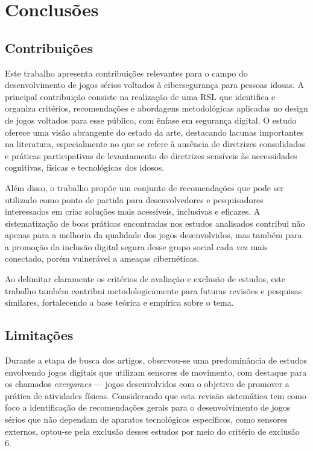 \chapter{Conclusões}
\label{cap:conclusoes}

\section{Contribuições}

Este trabalho apresenta contribuições relevantes para o campo do desenvolvimento de jogos sérios voltados à cibersegurança para pessoas idosas. A principal contribuição consiste na realização de uma RSL que identifica e organiza critérios, recomendações e abordagens metodológicas aplicadas no design de jogos voltados para esse público, com ênfase em segurança digital. O estudo oferece uma visão abrangente do estado da arte, destacando lacunas importantes na literatura, especialmente no que se refere à ausência de diretrizes consolidadas e práticas participativas de levantamento de diretrizes sensíveis às necessidades cognitivas, físicas e tecnológicas dos idosos.

Além disso, o trabalho propõe um conjunto de recomendações que pode ser utilizado como ponto de partida para desenvolvedores e pesquisadores interessados em criar soluções mais acessíveis, inclusivas e eficazes. A sistematização de boas práticas encontradas nos estudos analisados contribui não apenas para a melhoria da qualidade dos jogos desenvolvidos, mas também para a promoção da inclusão digital segura desse grupo social cada vez mais conectado, porém vulnerável a ameaças cibernéticas.

Ao delimitar claramente os critérios de avaliação e exclusão de estudos, este trabalho também contribui metodologicamente para futuras revisões e pesquisas similares, fortalecendo a base teórica e empírica sobre o tema.

\section{Limitações}

Durante a etapa de busca dos artigos, observou-se uma predominância de estudos envolvendo jogos digitais que utilizam sensores de movimento, com destaque para os chamados \textit{exergames} — jogos desenvolvidos com o objetivo de promover a prática de atividades físicas. Considerando que esta revisão sistemática tem como foco a identificação de recomendações gerais para o desenvolvimento de jogos sérios que não dependam de aparatos tecnológicos específicos, como sensores externos, optou-se pela exclusão desses estudos por meio do critério de exclusão 6.

